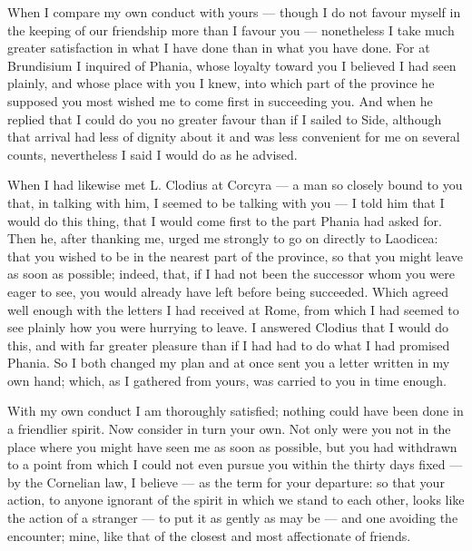 

 When I compare my own conduct with yours --- though I do not favour myself in the keeping of our friendship more than I favour you --- nonetheless I take much greater satisfaction in what I have done than in what you have done. For at Brundisium I inquired of Phania, whose loyalty toward you I believed I had seen plainly, and whose place with you I knew, into which part of the province he supposed you most wished me to come first in succeeding you. And when he replied that I could do you no greater favour than if I sailed to Side, although that arrival had less of dignity about it and was less convenient for me on several counts, nevertheless I said I would do as he advised.

 When I had likewise met L. Clodius at Corcyra --- a man so closely bound to you that, in talking with him, I seemed to be talking with you --- I told him that I would do this thing, that I would come first to the part Phania had asked for. Then he, after thanking me, urged me strongly to go on directly to Laodicea: that you wished to be in the nearest part of the province, so that you might leave as soon as possible; indeed, that, if I had not been the successor whom you were eager to see, you would already have left before being succeeded. Which agreed well enough with the letters I had received at Rome, from which I had seemed to see plainly how you were hurrying to leave. I answered Clodius that I would do this, and with far greater pleasure than if I had had to do what I had promised Phania. So I both changed my plan and at once sent you a letter written in my own hand; which, as I gathered from yours, was carried to you in time enough.

 With my own conduct I am thoroughly satisfied; nothing could have been done in a friendlier spirit. Now consider in turn your own. Not only were you not in the place where you might have seen me as soon as possible, but you had withdrawn to a point from which I could not even pursue you within the thirty days fixed --- by the Cornelian law, I believe --- as the term for your departure: so that your action, to anyone ignorant of the spirit in which we stand to each other, looks like the action of a stranger --- to put it as gently as may be --- and one avoiding the encounter; mine, like that of the closest and most affectionate of friends.


